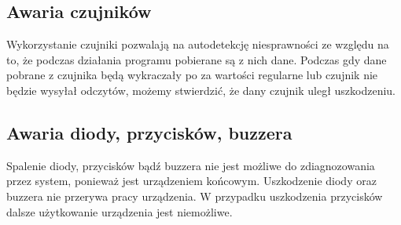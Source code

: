 \documentclass[11pt]{article}
\begin{document}
\subsection{Awaria czujników}
Wykorzystanie czujniki pozwalają na autodetekcję niesprawności ze względu na to, że podczas działania programu pobierane są z nich dane. Podczas gdy dane pobrane z czujnika będą wykraczały po za wartości regularne lub czujnik nie będzie wysyłał odczytów, możemy stwierdzić, że dany czujnik uległ uszkodzeniu. 

\newpage
\subsection{Awaria diody, przycisków, buzzera}
Spalenie diody, przycisków bądź buzzera nie jest możliwe do zdiagnozowania przez system, ponieważ jest urządzeniem końcowym. Uszkodzenie diody oraz buzzera nie przerywa pracy urządzenia. W przypadku uszkodzenia przycisków dalsze użytkowanie urządzenia jest niemożliwe.\\
\end{document}

